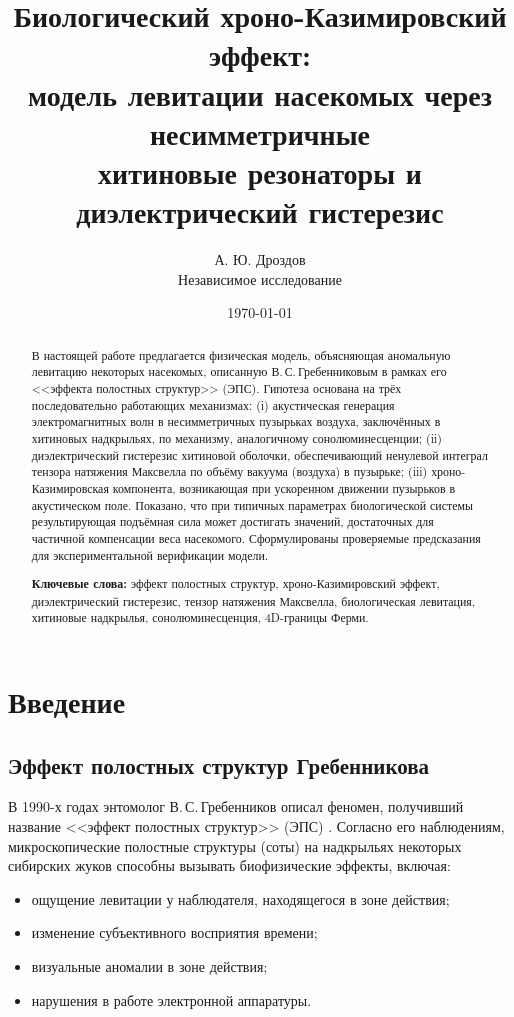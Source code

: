\documentclass[12pt,a4paper]{article}
\title{\textbf{Биологический хроно-Казимировский эффект:\\
модель левитации насекомых через несимметричные\\
хитиновые резонаторы и диэлектрический гистерезис}}
\author{А. Ю. Дроздов \\
\small Независимое исследование}
\date{\today}
\begin{document}
\maketitle

\begin{abstract}
\noindent
В настоящей работе предлагается физическая модель, объясняющая аномальную левитацию некоторых насекомых, описанную В.\,С.\,Гребенниковым в рамках его <<эффекта полостных структур>> (ЭПС). Гипотеза основана на трёх последовательно работающих механизмах: (i) акустическая генерация электромагнитных волн в несимметричных пузырьках воздуха, заключённых в хитиновых надкрыльях, по механизму, аналогичному сонолюминесценции; (ii) диэлектрический гистерезис хитиновой оболочки, обеспечивающий ненулевой интеграл тензора натяжения Максвелла по объёму вакуума (воздуха) в пузырьке; (iii) хроно-Казимировская компонента, возникающая при ускоренном движении пузырьков в акустическом поле. Показано, что при типичных параметрах биологической системы результирующая подъёмная сила может достигать значений, достаточных для частичной компенсации веса насекомого. Сформулированы проверяемые предсказания для экспериментальной верификации модели.

\bigskip
\noindent\textbf{Ключевые слова:} эффект полостных структур, хроно-Казимировский эффект, диэлектрический гистерезис, тензор натяжения Максвелла, биологическая левитация, хитиновые надкрылья, сонолюминесценция, 4D-границы Ферми.
\end{abstract}

\tableofcontents

\newpage

\section{Введение}

\subsection{Эффект полостных структур Гребенникова}

В 1990-х годах энтомолог В.\,С.\,Гребенников описал феномен, получивший название <<эффект полостных структур>> (ЭПС) \cite{grebennikov}. Согласно его наблюдениям, микроскопические полостные структуры (соты) на надкрыльях некоторых сибирских жуков способны вызывать биофизические эффекты, включая:
\begin{itemize}
    \item ощущение левитации у наблюдателя, находящегося в зоне действия;
    \item изменение субъективного восприятия времени;
    \item визуальные аномалии в зоне действия;
    \item нарушения в работе электронной аппаратуры.
\end{itemize}
\end{document}
